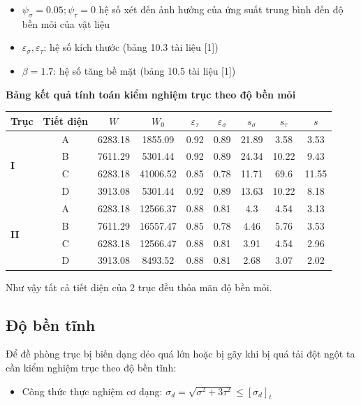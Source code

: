 \begin{itemize}
    \item $\psi_\sigma = 0.05; \psi_\tau = 0$ hệ số xét đến ảnh hưởng của ứng suất trung bình đến độ bền mỏi của vật liệu
    \item $\varepsilon_\sigma, \varepsilon_\tau$: hệ số kích thước (bảng 10.3 tài liệu [1])
    \item $\beta = 1.7$: hệ số tăng bề mặt (bảng 10.5 tài liệu [1])
\end{itemize}
\textbf{Bảng kết quả tính toán kiểm nghiệm trục theo độ bền mỏi}
\begin{center}
\begin{tabular}{|l|c|c|c|c|c|c|c|c|}
\hline
\textbf{Trục} & \textbf{Tiết diện} & $W$ & $ W_0 $ & $\varepsilon_\tau$ & $\varepsilon_\sigma$ & $s_\sigma$ & $s_\tau$ & $s$ \\
\hline
\multirow{4}{*}{\textbf{I}} & A & 6283.18 & 1855.09 & 0.92 & 0.89 & 21.89 & 3.58 & 3.53 \\
\cline{2-9}
& B & 7611.29 & 5301.44 & 0.92 & 0.89 & 24.34 & 10.22 & 9.43 \\
\cline{2-9}
& C & 6283.18 & 41006.52 & 0.85 & 0.78 & 11.71 & 69.6 & 11.55 \\
\cline{2-9}
& D & 3913.08 & 5301.44 & 0.92 & 0.89 & 13.63 & 10.22 & 8.18 \\
\hline
\multirow{4}{*}{\textbf{II}} & A & 6283.18 & 12566.37 & 0.88 & 0.81 & 4.3 & 4.54 & 3.13 \\
\cline{2-9}
& B & 7611.29 & 16557.47 & 0.85 & 0.78 & 4.46 & 5.76 & 3.53 \\
\cline{2-9}
& C & 6283.18 & 12566.47 & 0.88 & 0.81 & 3.91 & 4.54 & 2.96 \\
\cline{2-9}
& D & 3913.08 & 8493.52 & 0.88 & 0.81 & 2.68 & 3.07 & 2.02 \\
\hline
\end{tabular}
\end{center}
Như vậy tất cả tiết diện của 2 trục đều thỏa mãn độ bền mỏi.
\subsection{Độ bền tĩnh}
Để đề phòng trục bị biến dạng dẻo quá lớn hoặc bị gãy khi bị quá tải đột ngột ta cần kiểm nghiệm trục theo độ bền tĩnh:

\begin{itemize}
    \item Công thức thực nghiệm cơ dạng: $\sigma_d = \sqrt{\sigma^2 + 3\tau^2} \leq [\sigma_d]_t$
\end{itemize}

